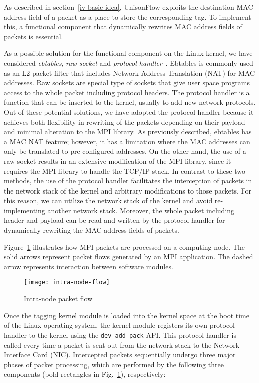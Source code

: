 As described in section~\ref{iv-basic-idea}, UnisonFlow exploits the
destination MAC address field of a packet as a place to store the
corresponding tag. To implement this, a functional component that
dynamically rewrites MAC address fields of packets is essential.

As a possible solution for the functional component on the Linux kernel,
we have considered \emph{ebtables}, \emph{raw socket} and \emph{protocol
handler}~\autocite{Rosen2013}. Ebtables is commonly used as an L2
packet filter that includes Network Address Translation (NAT) for MAC
addresses. Raw sockets are special type of sockets that give user space
programs access to the whole packet including protocol headers. The
protocol handler is a function that can be inserted to the kernel,
usually to add new network protocols. Out of these potential solutions,
we have adopted the protocol handler because it achieves both
flexibility in rewriting of the packets depending on their payload and
minimal alteration to the MPI library. As previously described, ebtables
has a MAC NAT feature; however, it has a limitation where the MAC
addresses can only be translated to pre-configured addresses. On the
other hand, the use of a raw socket results in an extensive modification
of the MPI library, since it requires the MPI library to handle the
TCP/IP stack. In contrast to these two methods, the use of the protocol
handler facilitates the interception of packets in the network stack of
the kernel and arbitrary modifications to those packets. For this
reason, we can utilize the network stack of the kernel and avoid
re-implementing another network stack. Moreover, the whole packet
including header and payload can be read and written by the protocol
handler for dynamically rewriting the MAC address fields of packets.

Figure~\ref{fig:intra-node-flow} illustrates how MPI packets are
processed on a computing node. The solid arrows represent packet flows
generated by an MPI application. The dashed arrow represents interaction
between software modules.

\begin{figure}
    \centering
    \texttt{[image: intra-node-flow]}
    \caption{Intra-node packet flow}%
    \label{fig:intra-node-flow}
\end{figure}

Once the tagging kernel module is loaded into the kernel space at the
boot time of the Linux operating system, the kernel module registers its
own protocol handler to the kernel using the
\lstinline!dev_add_pack! API\@. This protocol handler is
called every time a packet is sent out from the network stack to the
Network Interface Card (NIC). Intercepted packets sequentially undergo
three major phases of packet processing, which are performed by the
following three components (bold rectangles in
Fig.~\ref{fig:intra-node-flow}), respectively:

